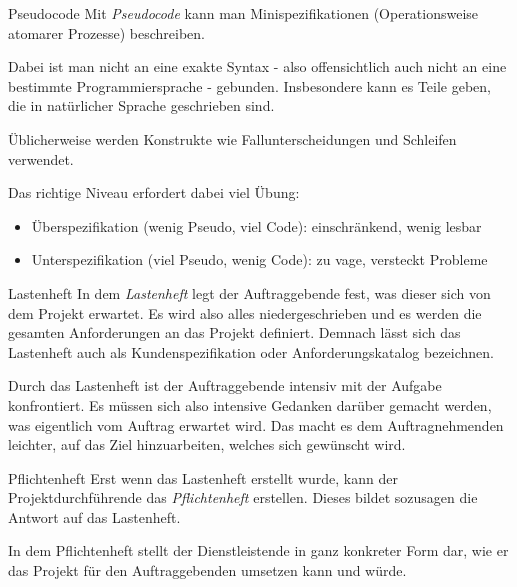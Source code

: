 \begin{bonus}{Pseudocode}
    Mit \emph{Pseudocode} kann man Minispezifikationen (Operationsweise atomarer Prozesse) beschreiben.

    Dabei ist man nicht an eine exakte Syntax - also offensichtlich auch nicht an eine bestimmte Programmiersprache - gebunden.
    Insbesondere kann es Teile geben, die in natürlicher Sprache geschrieben sind.

    Üblicherweise werden Konstrukte wie Fallunterscheidungen und Schleifen verwendet.

    Das richtige Niveau erfordert dabei viel Übung:
    \begin{itemize}
        \item Überspezifikation (wenig Pseudo, viel Code): einschränkend, wenig lesbar
        \item Unterspezifikation (viel Pseudo, wenig Code): zu vage, versteckt Probleme
    \end{itemize}
\end{bonus}

\begin{bonus}{Lastenheft}
    In dem \emph{Lastenheft} legt der Auftraggebende fest, was dieser sich von dem Projekt erwartet.
    Es wird also alles niedergeschrieben und es werden die  gesamten Anforderungen an das Projekt definiert.
    Demnach lässt sich das Lastenheft auch als Kundenspezifikation oder Anforderungskatalog bezeichnen.

    Durch das Lastenheft ist der Auftraggebende intensiv mit der Aufgabe konfrontiert.
    Es müssen sich also intensive Gedanken darüber gemacht werden, was eigentlich vom Auftrag erwartet wird.
    Das macht es dem Auftragnehmenden leichter, auf das Ziel hinzuarbeiten, welches sich gewünscht wird.
\end{bonus}

\begin{bonus}{Pflichtenheft}
    Erst wenn das Lastenheft erstellt wurde, kann der Projektdurchführende das \emph{Pflichtenheft} erstellen.
    Dieses bildet sozusagen die Antwort auf das Lastenheft.

    In dem Pflichtenheft stellt der Dienstleistende in ganz konkreter Form dar, wie er das Projekt für den Auftraggebenden umsetzen kann und würde.
\end{bonus}